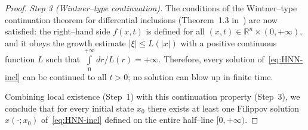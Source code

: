 \documentclass[journal]{IEEEtran}
\newtheorem{proof}{Proof}
\begin{document}
\begin{proof}
\emph{Step 3 (Wintner–type continuation).}
The conditions of the Wintner–type continuation theorem for
differential inclusions (Theorem~1.3 in~\cite[Ch.~1]{YLG}) are now
satisfied: the right–hand side $f(x,t)$ is defined for all
$(x,t)\in\mathbb{R}^n\times(0,+\infty)$, and it obeys the growth
estimate $|\xi|\le L(|x|)$ with a positive continuous function $L$
such that $\int\limits_0^{+\infty}dr/L(r)=+\infty$.
Therefore, every solution of~\eqref{eq:HNN-incl} can be continued to
all $t>0$; no solution can blow up in finite time.

Combining local existence (Step~1) with this continuation property
(Step~3), we conclude that for every initial state $x_0$ there exists
at least one Filippov solution $x(\cdot;x_0)$ of~\eqref{eq:HNN-incl}
defined on the entire half–line $[0,+\infty)$.
\end{proof}


\end{document}
